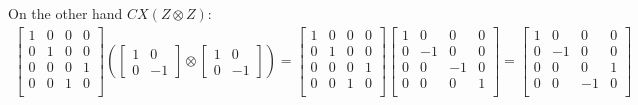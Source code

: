 \documentclass[12pt,a4paper]{article}
\begin{document}
On the other hand $CX \left( Z \otimes Z \right)$: 
\begin{equation*}
    \begin{split}
        \begin{bmatrix}
        1 & 0 & 0 & 0\\
        0 & 1 & 0 & 0\\
        0 & 0 & 0 & 1\\
        0 & 0 & 1 & 0\\
        \end{bmatrix} \left( \begin{bmatrix}
        1 & 0 \\
        0 & -1
    \end{bmatrix} \otimes \begin{bmatrix}
        1 & 0 \\
        0 & -1
    \end{bmatrix} \right) = \begin{bmatrix}
        1 & 0 & 0 & 0\\
        0 & 1 & 0 & 0\\
        0 & 0 & 0 & 1\\
        0 & 0 & 1 & 0\\
        \end{bmatrix} \begin{bmatrix}
        1 & 0 & 0 & 0\\
        0 & -1 & 0 & 0\\
        0 & 0 & -1 & 0\\
        0 & 0 & 0 & 1\\
        \end{bmatrix} = \begin{bmatrix}
        1 & 0 & 0 & 0\\
        0 & -1 & 0 & 0\\
        0 & 0 & 0 & 1\\
        0 & 0 & -1 & 0\\
        \end{bmatrix} 
    \end{split}
\end{equation*}
\end{document}
